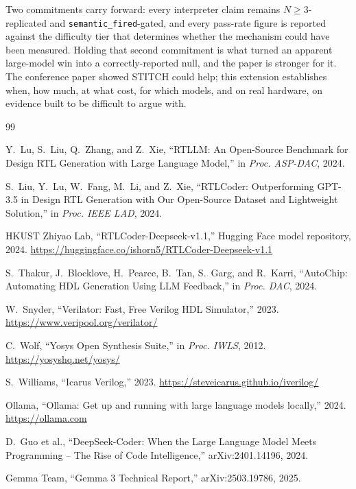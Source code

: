 \documentclass[11pt]{article}
\begin{document}
Two commitments carry forward: every interpreter claim remains
$N{\geq}3$-replicated and \texttt{semantic\_fired}-gated, and every pass-rate
figure is reported against the difficulty tier that determines whether the
mechanism could have been measured. Holding that second commitment is what
turned an apparent large-model win into a correctly-reported null, and the
paper is stronger for it. The conference paper showed STITCH could help; this
extension establishes when, how much, at what cost, for which models, and on
real hardware, on evidence built to be difficult to argue with.

\begin{thebibliography}{99}

Y.~Lu, S.~Liu, Q.~Zhang, and Z.~Xie, ``RTLLM: An Open-Source Benchmark for
Design RTL Generation with Large Language Model,'' in \emph{Proc. ASP-DAC},
2024.

S.~Liu, Y.~Lu, W.~Fang, M.~Li, and Z.~Xie, ``RTLCoder: Outperforming GPT-3.5 in
Design RTL Generation with Our Open-Source Dataset and Lightweight Solution,''
in \emph{Proc. IEEE LAD}, 2024.

HKUST Zhiyao Lab, ``RTLCoder-Deepseek-v1.1,'' Hugging Face model repository,
2024. \url{https://huggingface.co/ishorn5/RTLCoder-Deepseek-v1.1}

S.~Thakur, J.~Blocklove, H.~Pearce, B.~Tan, S.~Garg, and R.~Karri, ``AutoChip:
Automating HDL Generation Using LLM Feedback,'' in \emph{Proc. DAC}, 2024.

W.~Snyder, ``Verilator: Fast, Free Verilog HDL Simulator,'' 2023.
\url{https://www.veripool.org/verilator/}

C.~Wolf, ``Yosys Open Synthesis Suite,'' in \emph{Proc. IWLS}, 2012.
\url{https://yosyshq.net/yosys/}

S.~Williams, ``Icarus Verilog,'' 2023.
\url{https://steveicarus.github.io/iverilog/}

Ollama, ``Ollama: Get up and running with large language models locally,''
2024. \url{https://ollama.com}

D.~Guo et al., ``DeepSeek-Coder: When the Large Language Model Meets
Programming -- The Rise of Code Intelligence,'' arXiv:2401.14196, 2024.

Gemma Team, ``Gemma 3 Technical Report,'' arXiv:2503.19786, 2025.


\end{thebibliography}
\end{document}
